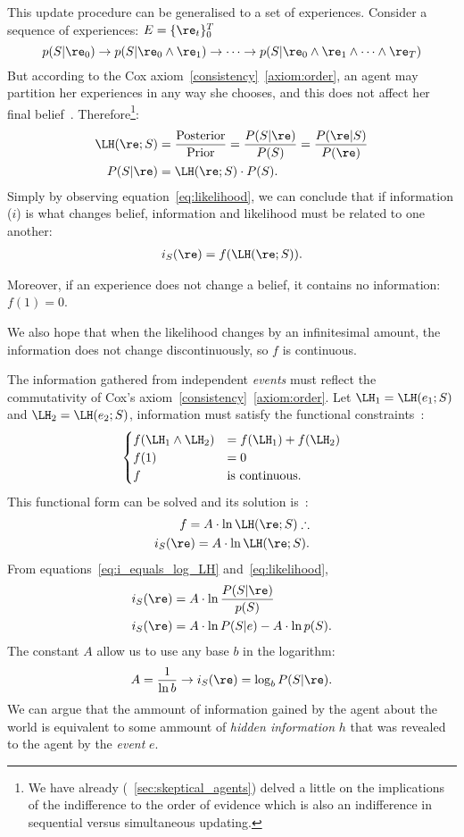 This update procedure can be generalised to a set of experiences. Consider a sequence of experiences: \(E = \{\re_t\}_0^T\)
\[p(S|\re_0) \to p(S|\re_0 \land \re_1) \to \cdots \to p(S|\re_0 \land \re_1 \land \cdots \land \re_T)
  \]
But according to the Cox axiom~\ref{consistency}~\ref{axiom:order}, an agent may partition her experiences in any way she chooses, and this does not affect her final belief~\cite{sowinski:2016}. Therefore\footnote{We have already (~\cref {sec:skeptical_agents}) delved a little on the implications of the indifference to the order of evidence which is also an indifference in sequential versus simultaneous updating.}:
\begin{align}
	\LH(\re; S) &= \frac{\text{Posterior}}{\text{Prior}} = \frac{P(S | \re )}{P(S)} = \frac{P(\re | S )}{P(\re)} \label{eq:likelihood}\\
	P(S|\re ) &= \LH(\re; S)\cdot P(S).
 \end{align}
Simply by observing equation~\ref{eq:likelihood}, we can conclude that if information (\(i\)) is what changes belief, information and likelihood must be related to one another:
\begin{align}
	i_S(\re) = f(\LH(\re; S)).
\label{eq:information_as_function_of_likelihood} \end{align}

Moreover, if an experience does not change a belief, it contains no information: \(f(1)=0\).

We also hope that when the likelihood changes by an infinitesimal amount, the information does not change discontinuously, so \(f\) is continuous.

The information gathered from independent \emph{events} must reflect the commutativity of Cox's axiom~\ref{consistency}~\ref{axiom:order}. Let \(\LH_1 = \LH (e_1; S)\) and \(\LH_2 = \LH (e_2; S)\), information must satisfy the functional constraints~\cite{sowinski:2016}:
\[
\begin{cases}
	f(\LH_1 \land \LH_2) &= f(\LH_1) + f(\LH_2)\\
	f(1) &= 0\\
	f &\text{is continuous.}
\end{cases}
\]
This functional form can be solved and its solution is~\cite{caticha:2008}:
\begin{align}
	f = A \cdot \ln{\LH(\re; S)} \therefore \nonumber\\
	i_S(\re) = A \cdot \ln{\LH(\re; S)}.\label{eq:i_equals_log_LH}
\end{align}
From equations~\ref{eq:i_equals_log_LH} and~\ref{eq:likelihood},
\begin{align}
	i_S(\re) &= A \cdot \ln{ \frac{P(S | \re )}{p(S)}}\\
	i_S(\re) &= A \cdot \ln{ P(S|e )} - A \cdot \ln{p(S)}.
\label{eq:is_ln} \end{align}
The constant \(A\) allow us to use any base \(b\) in the logarithm:
\begin{align}
	A = \frac {1}{\ln b} \to i_S(\re) = \log_b P(S|\re ).
\end{align}
We can argue that the ammount of information gained by the agent about the world is equivalent to some ammount of \emph{hidden information} \(h\) that was revealed to the agent by the \emph{event} \(e\).

